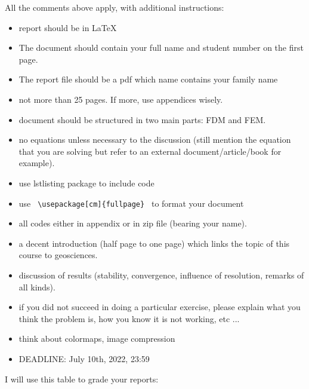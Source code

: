 All the comments above apply, with additional instructions:
\begin{itemize}
\item report should be in \LaTeX 
\item The document should contain your full name and student number on the first page. 
\item The report file should be a pdf which name contains your family name
\item not more than 25 pages. If more, use appendices wisely.
\item document should be structured in two main parts: FDM and FEM.
\item no equations unless necessary to the discussion (still mention the equation that 
you are solving but refer to an external document/article/book for example).
\item use lstlisting package to include code
\item use {\verb| \usepackage[cm]{fullpage} |} to format your document
\item all codes either in appendix or in zip file (bearing your name).
\item a decent introduction (half page to one page) which links the topic of this course to geosciences.
\item discussion of results (stability, convergence, influence of resolution, remarks of all kinds).
\item if you did not succeed in doing a particular exercise, please explain what you think the problem is, 
how you know it is not working, etc ...
\item think about colormaps, image compression
\item DEADLINE: July 10th, 2022, 23:59 
\end{itemize}


I will use this table to grade your reports:

\vspace{3cm}


